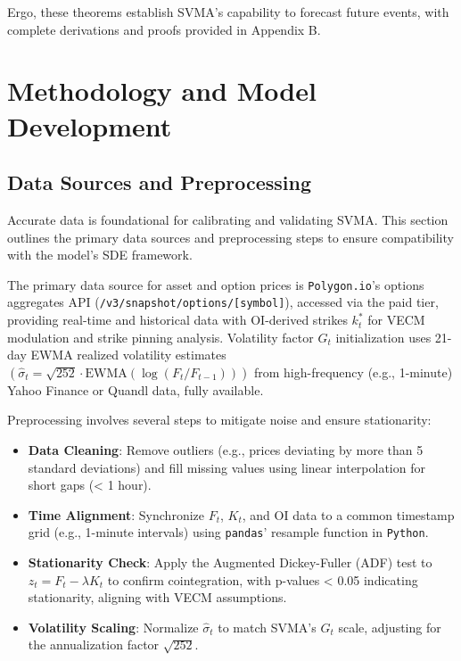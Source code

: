 \documentclass[12pt]{report}
\begin{document}
\vspace{0.2in}

Ergo, these theorems establish SVMA’s capability to forecast future events, with complete derivations and proofs provided in Appendix B.

\chapter{Methodology and Model Development}

\section{Data Sources and Preprocessing}

Accurate data is foundational for calibrating and validating SVMA. This section outlines the primary data sources and preprocessing steps to ensure compatibility with the model’s SDE framework.

\vspace{0.2in}

The primary data source for asset and option prices is \texttt{Polygon.io}’s options aggregates API (\texttt{/v3/snapshot/options/[symbol]}), accessed via the paid tier, providing real-time and historical data with OI-derived strikes \(k_t^*\) for VECM modulation and strike pinning analysis. Volatility factor \(G_t\) initialization uses 21-day EWMA realized volatility estimates \((\hat{\sigma}_t = \sqrt{252} \cdot \text{EWMA}(\log(F_t/F_{t-1})))\) from high-frequency (e.g., 1-minute) Yahoo Finance or Quandl data, fully available.

\vspace{0.2in}

Preprocessing involves several steps to mitigate noise and ensure stationarity:
\begin{itemize}\setlength{\itemsep}{0pt}\setlength{\parskip}{4pt}
    \item \textbf{Data Cleaning}: Remove outliers (e.g., prices deviating by more than 5 standard deviations) and fill missing values using linear interpolation for short gaps (< 1 hour).
    \item \textbf{Time Alignment}: Synchronize \(F_t\), \(K_t\), and OI data to a common timestamp grid (e.g., 1-minute intervals) using \texttt{pandas}’ resample function in \texttt{Python}.
    \item \textbf{Stationarity Check}: Apply the Augmented Dickey-Fuller (ADF) test to \(z_t = F_t - \lambda K_t\) to confirm cointegration, with p-values < 0.05 indicating stationarity, aligning with VECM assumptions.
    \item \textbf{Volatility Scaling}: Normalize \(\hat{\sigma}_t\) to match SVMA’s \(G_t\) scale, adjusting for the annualization factor \(\sqrt{252}\).
\end{itemize}
\end{document}
